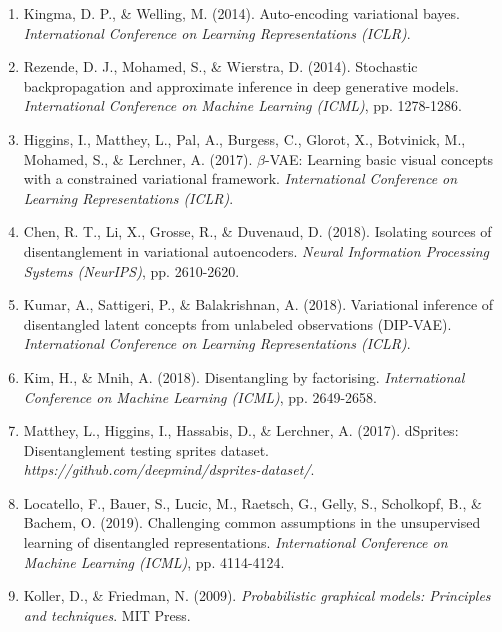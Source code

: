 \documentclass[conference]{IEEEtran}
\begin{document}
\begin{enumerate}
    \item Kingma, D. P., \& Welling, M. (2014). Auto-encoding variational bayes. \textit{International Conference on Learning Representations (ICLR)}.
    
    \item Rezende, D. J., Mohamed, S., \& Wierstra, D. (2014). Stochastic backpropagation and approximate inference in deep generative models. \textit{International Conference on Machine Learning (ICML)}, pp. 1278-1286.
    
    \item Higgins, I., Matthey, L., Pal, A., Burgess, C., Glorot, X., Botvinick, M., Mohamed, S., \& Lerchner, A. (2017). $\beta$-VAE: Learning basic visual concepts with a constrained variational framework. \textit{International Conference on Learning Representations (ICLR)}.
    
    \item Chen, R. T., Li, X., Grosse, R., \& Duvenaud, D. (2018). Isolating sources of disentanglement in variational autoencoders. \textit{Neural Information Processing Systems (NeurIPS)}, pp. 2610-2620.
    
    \item Kumar, A., Sattigeri, P., \& Balakrishnan, A. (2018). Variational inference of disentangled latent concepts from unlabeled observations (DIP-VAE). \textit{International Conference on Learning Representations (ICLR)}.
    
    \item Kim, H., \& Mnih, A. (2018). Disentangling by factorising. \textit{International Conference on Machine Learning (ICML)}, pp. 2649-2658.
    
    \item Matthey, L., Higgins, I., Hassabis, D., \& Lerchner, A. (2017). dSprites: Disentanglement testing sprites dataset. \textit{https://github.com/deepmind/dsprites-dataset/}.
    
    \item Locatello, F., Bauer, S., Lucic, M., Raetsch, G., Gelly, S., Scholkopf, B., \& Bachem, O. (2019). Challenging common assumptions in the unsupervised learning of disentangled representations. \textit{International Conference on Machine Learning (ICML)}, pp. 4114-4124.
    
    \item Koller, D., \& Friedman, N. (2009). \textit{Probabilistic graphical models: Principles and techniques}. MIT Press.
    

\end{enumerate}
\end{document}
